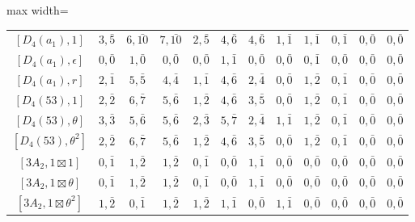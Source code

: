\begin{table}[ht]
\begin{adjustbox}{max width=\linewidth}
\begin{tabular}{|c|ccccccccccc|}
        $[D_4(a_1), 1]$        & $3, \bar{5}$ & $6, \bar{10}$ & $7, \bar{10}$ & $2, \bar{5}$ & $4, \bar{6}$ & $4, \bar{6}$ & $1, \bar{1}$ & $1, \bar{1}$ & $0, \bar{1}$ & $0, \bar{0}$ & $0, \bar{0}$ \\ 
        $[D_4(a_1), \epsilon]$  & $0, \bar{0}$ & $1, \bar{0}$ & $0, \bar{0}$ & $0, \bar{0}$ & $1, \bar{1}$ & $0, \bar{0}$ & $0, \bar{0}$ & $0, \bar{1}$ & $0, \bar{0}$ & $0, \bar{0}$ & $0, \bar{0}$ \\ 
        $[D_4(a_1), r]$        & $2, \bar{1}$ & $5, \bar{5}$ & $4, \bar{4}$ & $1, \bar{1}$ & $4, \bar{6}$ & $2, \bar{4}$ & $0, \bar{0}$ & $1, \bar{2}$ & $0, \bar{1}$ & $0, \bar{0}$ & $0, \bar{0}$ \\ 
        $[D_4(53), 1]$         & $2, \bar{2}$ & $6, \bar{7}$ & $5, \bar{6}$ & $1, \bar{2}$ & $4, \bar{6}$ & $3, \bar{5}$ & $0, \bar{0}$ & $1, \bar{2}$ & $0, \bar{1}$ & $0, \bar{0}$ & $0, \bar{0}$ \\
        $[D_4(53), \theta]$    & $3, \bar{3}$ & $5, \bar{6}$ & $5, \bar{6}$ & $2, \bar{3}$ & $5, \bar{7}$ & $2, \bar{4}$ & $1, \bar{1}$ & $1, \bar{2}$ & $0, \bar{1}$ & $0, \bar{0}$ & $0, \bar{0}$ \\ 
        $[D_4(53), \theta^2]$  & $2, \bar{2}$ & $6, \bar{7}$ & $5, \bar{6}$ & $1, \bar{2}$ & $4, \bar{6}$ & $3, \bar{5}$ & $0, \bar{0}$ & $1, \bar{2}$ & $0, \bar{1}$ & $0, \bar{0}$ & $0, \bar{0}$ \\
        $[3A_2, 1\boxtimes1]$            & $0, \bar{1}$ & $1, \bar{2}$ & $1, \bar{2}$ & $0, \bar{1}$ & $0, \bar{0}$ & $1, \bar{1}$ & $0, \bar{0}$ & $0, \bar{0}$ & $0, \bar{0}$ & $0, \bar{0}$ & $0, \bar{0}$ \\
        $[3A_2, 1\boxtimes\theta]$       & $0, \bar{1}$ & $1, \bar{2}$ & $1, \bar{2}$ & $0, \bar{1}$ & $0, \bar{0}$ & $1, \bar{1}$ & $0, \bar{0}$ & $0, \bar{0}$ & $0, \bar{0}$ & $0, \bar{0}$ & $0, \bar{0}$ \\
        $[3A_2, 1\boxtimes\theta^2]$     & $1, \bar{2}$ & $0, \bar{1}$ & $1, \bar{2}$ & $1, \bar{2}$ & $1, \bar{1}$ & $0, \bar{0}$ & $1, \bar{1}$ & $0, \bar{0}$ & $0, \bar{0}$ & $0, \bar{0}$ & $0, \bar{0}$ \\ \hline


\end{tabular}
\end{adjustbox}
\end{table}
